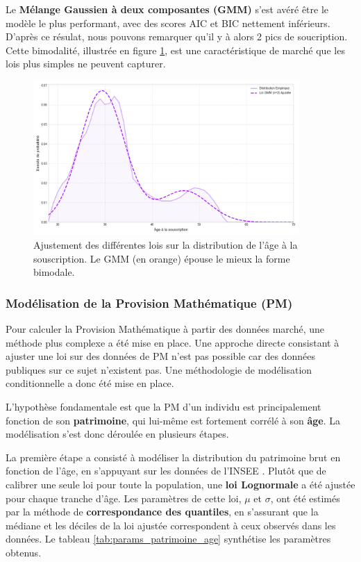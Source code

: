 Le \textbf{Mélange Gaussien à deux composantes (GMM)} s'est avéré être le modèle le plus performant, avec des scores AIC et BIC nettement inférieurs. D'après ce résulat, nous pouvons remarquer qu'il y à alors 2 pics de soucription. Cette bimodalité, illustrée en figure \ref{fig:gmm_souscription}, est une caractéristique de marché que les lois plus simples ne peuvent capturer.

\begin{figure}[H]
\centering
\includegraphics[width=0.9\textwidth]{images/2_chapitres/chapitre3/calibration_loi_GMM_souscription.png}
\caption{Ajustement des différentes lois sur la distribution de l'âge à la souscription. Le GMM (en orange) épouse le mieux la forme bimodale.}
\label{fig:gmm_souscription}
\end{figure}


\subsubsection{Modélisation de la Provision Mathématique (PM)}

Pour calculer la Provision Mathématique à partir des données marché, une méthode plus complexe a été mise en place. Une approche directe consistant à ajuster une loi sur des données de PM n'est pas possible car des données publiques sur ce sujet n'existent pas. Une méthodologie de modélisation conditionnelle a donc été mise en place.

L'hypothèse fondamentale est que la PM d'un individu est principalement fonction de son \textbf{patrimoine}, qui lui-même est fortement corrélé à son \textbf{âge}. La modélisation s'est donc déroulée en plusieurs étapes.


La première étape a consisté à modéliser la distribution du patrimoine brut en fonction de l'âge, en s'appuyant sur les données de l'INSEE \cite{insee_patrimoine_age}. Plutôt que de calibrer une seule loi pour toute la population, une \textbf{loi Lognormale} a été ajustée pour chaque tranche d'âge. Les paramètres de cette loi, $\mu$ et $\sigma$, ont été estimés par la méthode de \textbf{correspondance des quantiles}, en s'assurant que la médiane et les déciles de la loi ajustée correspondent à ceux observés dans les données. Le tableau \ref{tab:params_patrimoine_age} synthétise les paramètres obtenus.

